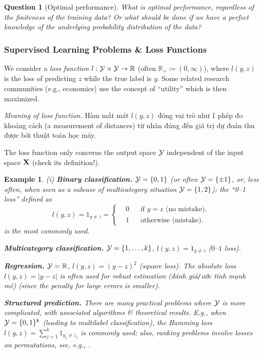 \documentclass{article}
\newtheorem{example}{Example}
\newtheorem{question}{Question}
\begin{document}
\begin{question}[Optimal performance]
	What is optimal performance, regardless of the finiteness of the training data? Or what should be done if we have a perfect knowledge of the underlying probability distribution of the data?
\end{question}

\subsubsection{Supervised Learning Problems \& Loss Functions}
We consider a {\it loss function} $l:{\cal Y}\times{\cal Y}\to\mathbb{R}$ (often $\mathbb{R}_+\coloneqq(0,\infty)$), where $l(y,z)$ is the loss of predicting $z$ while the true label is $y$. Some related research communities (e.g., economics) use the concept of ``utility'' which is then maximized.

{\it Meaning of loss function.} Hàm mất mát $l(y,z)$ đóng vai trò như 1 phép đo khoảng cách (a measurement of distances) từ nhãn đúng đến giá trị dự đoán thu được bởi thuật toán học máy.

The loss function only concerns the output space ${\cal Y}$ independent of the input space ${\bf X}$ (check its definition!).
\begin{example}
	\item(i) {\bf Binary classification.} ${\cal Y} = \{0,1\}$ (or often ${\cal Y} = \{\pm1\}$, or, less often, when seen as a subcase of multicategory situation ${\cal Y} = \{1,2\}$); the ``0--1 loss'' defined as
	\begin{equation*}
		l(y,z) = 1_{y\ne z} = \left\{\begin{split}
			&0&&\mbox{if } y = z\mbox{ (no mistake)},\\
			&1&&\mbox{otherwise (mistake)}.
		\end{split}\right.
	\end{equation*}
	is the most commonly used.
	\item {\bf Multicategory classification.} ${\cal Y} = \{1,\ldots,k\}$, $l(y,z) = 1_{y\ne z}$ ($0$--$1$ loss).
	\item {\bf Regression.} ${\cal Y} = \mathbb{R}$, $l(y,z) = (y - z)^2$ (square loss). The absolute loss $l(y,z) = |y - z|$ is often used for robust estimation (đánh giá{\tt/}ước tính mạnh mẽ) (since the penalty for large errors is smaller).
	\item {\bf Structured prediction.} There are many practical problems where ${\cal Y}$ is more complicated, with associated algorithms \& theoretical results. E.g., when ${\cal Y} = \{0,1\}^k$ (leading to \emph{multilabel classification}), the \emph{Hamming loss} $l(y,z) = \sum_{j=1}^k 1_{y_j\ne z_j}$ is commonly used; also, ranking problems involve losses on permutations, see, e.g., \cite[Chap. 13: Structured Prediction]{Bach2024}.
\end{example}
\end{document}
